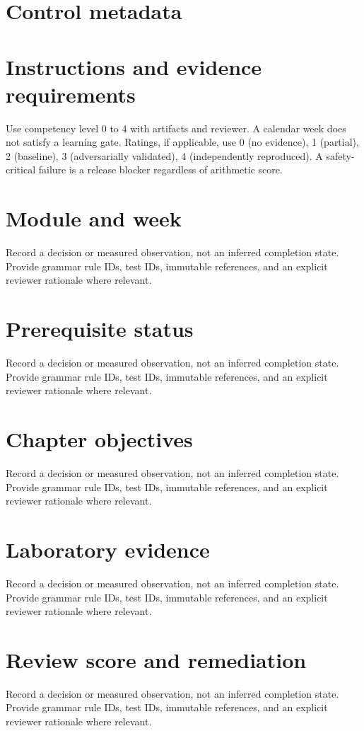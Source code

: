 \documentclass[11pt,letterpaper]{article}
\begin{document}
\makedoctitle\makedocsummary
\tableofcontents\clearpage
\section{Control metadata}
\section{Instructions and evidence requirements}
Use competency level 0 to 4 with artifacts and reviewer. A calendar week does not satisfy a learning gate. Ratings, if applicable, use 0 (no evidence), 1 (partial), 2 (baseline), 3 (adversarially validated), 4 (independently reproduced). A safety-critical failure is a release blocker regardless of arithmetic score.
\section{Module and week}
Record a decision or measured observation, not an inferred completion state. Provide grammar rule IDs, test IDs, immutable references, and an explicit reviewer rationale where relevant.
\section{Prerequisite status}
Record a decision or measured observation, not an inferred completion state. Provide grammar rule IDs, test IDs, immutable references, and an explicit reviewer rationale where relevant.
\section{Chapter objectives}
Record a decision or measured observation, not an inferred completion state. Provide grammar rule IDs, test IDs, immutable references, and an explicit reviewer rationale where relevant.
\section{Laboratory evidence}
Record a decision or measured observation, not an inferred completion state. Provide grammar rule IDs, test IDs, immutable references, and an explicit reviewer rationale where relevant.
\section{Review score and remediation}
Record a decision or measured observation, not an inferred completion state. Provide grammar rule IDs, test IDs, immutable references, and an explicit reviewer rationale where relevant.
\end{document}
